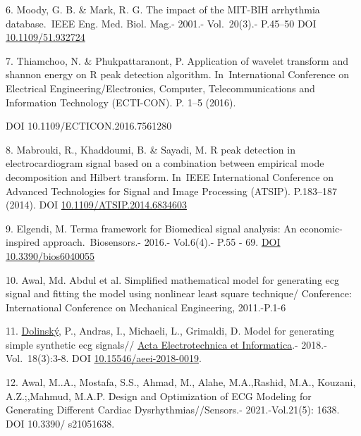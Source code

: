 {6. Moody, G. B. \& Mark, R. G. The impact of the MIT-BIH arrhythmia
database.~IEEE Eng. Med. Biol. Mag.- 2001.- Vol.~20(3).- P.45--50 DOI
\href{https://doi.org/10.1109/51.932724}{10.1109/51.932724}

7. Thiamchoo, N. \& Phukpattaranont, P. Application of wavelet transform
and shannon energy on R peak detection algorithm. In~International
Conference on Electrical Engineering/Electronics, Computer,
Telecommunications and Information Technology (ECTI-CON). P. 1--5
(2016).

DOI 10.1109/ECTICON.2016.7561280

8. Mabrouki, R., Khaddoumi, B. \& Sayadi, M. R peak detection in
electrocardiogram signal based on a combination between empirical mode
decomposition and Hilbert transform. In~IEEE International Conference on
Advanced Technologies for Signal and Image Processing (ATSIP).
P.183--187 (2014). DOI
\href{http://dx.doi.org/10.1109\%2FATSIP.2014.6834603}{10.1109/ATSIP.2014.6834603}

9. Elgendi, M. Terma framework for Biomedical signal analysis: An
economic-inspired approach.~Biosensors.- 2016.- Vol.6(4).- P.55 - 69.
\href{https://doi.org/10.3390/bios6040055}{DOI 10.3390/bios6040055}

10. Awal, Md. Abdul et al. Simplified mathematical model for generating
ecg signal and fitting the model using nonlinear least square technique/
Conference: International Conference on Mechanical Engineering,
2011.-P.1-6

11.
\href{https://www.researchgate.net/scientific-contributions/Pavol-Dolinsky-2111486589?_sg\%5B0\%5D=OpDWPWB7F-xsKNW7QhdA72wrK8fp7beQ04-y1V0k2OSl-vY7yVCBibx1np_IexfBvwzs1tc.3cwJN3iOVCnhElwMBHi_44SzEhdGHYZWVIVDkbQ1O1b7A14CJ6y-CqFfnB303LWj8pCAkU8V0IFoKmFKiUohPw&_sg\%5B1\%5D=AVFGn2hkG-rhmm2v1aXJV9E-zSTVwesxqk3bJDU_jEY7VSRsfP3brCGDMfFzLd-5yvpDVx0.qPkk_lpV-CUBkVH8P4FChkQpEOFV8sRGeKQiTftWsOp6D_liXpE1YL21VpUyx-lJcgXk9ynFK7DYQ-rBYDhYVA}{Dolinský},
P., Andras, I., Michaeli, L., Grimaldi, D. Model for generating simple
synthetic ecg signals//
\href{https://www.researchgate.net/journal/Acta-Electrotechnica-et-Informatica-1338-3957?_tp=eyJjb250ZXh0Ijp7ImZpcnN0UGFnZSI6InB1YmxpY2F0aW9uIiwicGFnZSI6InB1YmxpY2F0aW9uIiwicG9zaXRpb24iOiJwYWdlSGVhZGVyIn19}{Acta
Electrotechnica et Informatica}.- 2018.-Vol.~18(3):3-8. DOI
\href{http://dx.doi.org/10.15546/aeei-2018-0019}{10.15546/aeei-2018-0019}.

12. Awal, M..A., Mostafa, S.S., Ahmad, M., Alahe, M.A.,Rashid, M.A.,
Kouzani, A.Z.;,Mahmud, M.A.P. Design and Optimization of ECG Modeling
for Generating Different Cardiac Dysrhythmias//Sensors.-
2021.-Vol.21(5): 1638. DOI 10.3390/ s21051638.

}
